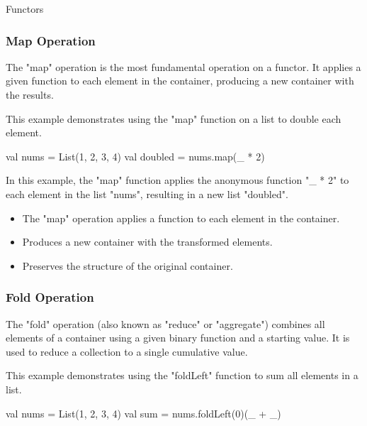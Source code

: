 \begin{notes}{Functors}
    \subsubsection*{Map Operation}
    
    The "map" operation is the most fundamental operation on a functor. It applies a given function to each element in the container, producing a new container with the results.
    
    \begin{highlight}
    
        This example demonstrates using the "map" function on a list to double each element.
    
    \begin{code}[Scala]
    val nums = List(1, 2, 3, 4)
    val doubled = nums.map(_ * 2)
    \end{code}
    
        In this example, the "map" function applies the anonymous function "\_ * 2" to each element in the list "nums", resulting in a new list "doubled".
    
        \begin{itemize}
            \item The "map" operation applies a function to each element in the container.
            \item Produces a new container with the transformed elements.
            \item Preserves the structure of the original container.
        \end{itemize}
    
    \end{highlight}
    
    \subsubsection*{Fold Operation}
    
    The "fold" operation (also known as "reduce" or "aggregate") combines all elements of a container using a given binary function and a starting value. It is used to reduce a collection to a single cumulative value.
    
    \begin{highlight}
    
        This example demonstrates using the "foldLeft" function to sum all elements in a list.
    
    \begin{code}[Scala]
    val nums = List(1, 2, 3, 4)
    val sum = nums.foldLeft(0)(_ + _)
    \end{code}
    

\end{highlight}
\end{notes}

